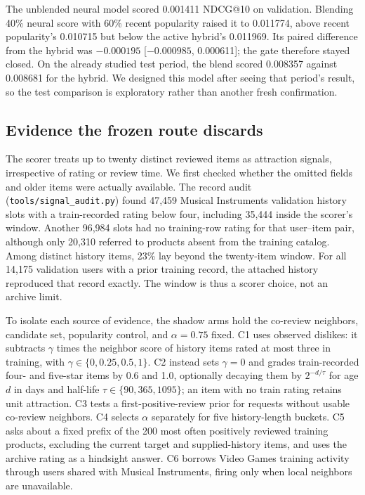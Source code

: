 \documentclass[11pt]{article}
\begin{document}
The unblended neural model scored 0.001411 NDCG@10 on validation. Blending 40\% neural score with 60\% recent popularity raised it to 0.011774, above recent popularity's 0.010715 but below the active hybrid's 0.011969. Its paired difference from the hybrid was $-0.000195$ [$-0.000985$, 0.000611]; the gate therefore stayed closed. On the already studied test period, the blend scored 0.008357 against 0.008681 for the hybrid. We designed this model after seeing that period's result, so the test comparison is exploratory rather than another fresh confirmation.

\subsection{Evidence the frozen route discards}
The scorer treats up to twenty distinct reviewed items as attraction signals, irrespective of rating or review time. We first checked whether the omitted fields and older items were actually available. The record audit (\texttt{tools/signal\_audit.py}) found 47,459 Musical Instruments validation history slots with a train-recorded rating below four, including 35,444 inside the scorer's window. Another 96,984 slots had no training-row rating for that user--item pair, although only 20,310 referred to products absent from the training catalog. Among distinct history items, 23\% lay beyond the twenty-item window. For all 14,175 validation users with a prior training record, the attached history reproduced that record exactly. The window is thus a scorer choice, not an archive limit.

To isolate each source of evidence, the shadow arms hold the co-review neighbors, candidate set, popularity control, and $\alpha=0.75$ fixed. C1 uses observed dislikes: it subtracts $\gamma$ times the neighbor score of history items rated at most three in training, with $\gamma\in\{0,0.25,0.5,1\}$. C2 instead sets $\gamma=0$ and grades train-recorded four- and five-star items by 0.6 and 1.0, optionally decaying them by $2^{-d/\tau}$ for age $d$ in days and half-life $\tau\in\{90,365,1095\}$; an item with no train rating retains unit attraction. C3 tests a first-positive-review prior for requests without usable co-review neighbors. C4 selects $\alpha$ separately for five history-length buckets. C5 asks about a fixed prefix of the 200 most often positively reviewed training products, excluding the current target and supplied-history items, and uses the archive rating as a hindsight answer. C6 borrows Video Games training activity through users shared with Musical Instruments, firing only when local neighbors are unavailable.
\end{document}
